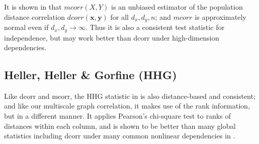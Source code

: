 \documentclass[11pt]{article}
\providecommand{\mb}[1]{\boldsymbol{#1}}
\begin{document}
It is shown in \cite{SzekelyRizzo2013a} that $mcorr(X,Y)$ is an unbiased estimator of the population distance correlation $dcorr(\mb{x},\mb{y})$ for all $d_{x}, d_{y}, n$; and $mcorr$ is approximately normal even if $d_{x},d_{y} \rightarrow \infty$. Thus it is also a consistent test statistic for independence, but may work better than dcorr under high-dimension dependencies. 


\subsection{Heller, Heller \& Gorfine (HHG)}
\label{appen:hhg}
Like dcorr and mcorr, the HHG statistic in \cite{HellerGorfine2013} is also distance-based and consistent; and like our multiscale graph correlation, it makes use of the rank information, but in a different manner. It applies Pearson's chi-square test to ranks of distances within each column, and is shown to be better than many global statistics including dcorr under many common nonlinear dependencies in \cite{GorfineHellerHeller2012, HellerGorfine2013}. 
\end{document}
